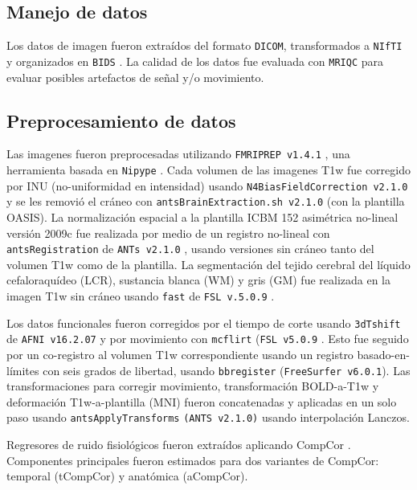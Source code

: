 \subsection{Manejo de datos}
Los datos de imagen fueron extraídos del formato \texttt{DICOM}, transformados a \texttt{NIfTI} y organizados en \texttt{BIDS} \parencite{Gorgolewski2016}.
La calidad de los datos fue evaluada con \texttt{MRIQC} \parencite{Esteban2017} para evaluar posibles artefactos de señal y/o movimiento. \par

\subsection{Preprocesamiento de datos}
Las imagenes fueron preprocesadas utilizando \texttt{FMRIPREP v1.4.1} \parencite{Esteban2019}, una herramienta basada en \texttt{Nipype} \parencite{Gorgolewski2011}.
Cada volumen de las imagenes T1w fue corregido por INU (no-uniformidad en intensidad) usando \texttt{N4BiasFieldCorrection v2.1.0} \parencite{Tustison2010} y se les removió el cráneo con \texttt{antsBrainExtraction.sh v2.1.0} (con la plantilla OASIS).
La normalización espacial a la plantilla ICBM 152 asimétrica no-lineal versión 2009c \parencite{Fonov2009} fue realizada por medio de un registro no-lineal con \texttt{antsRegistration} de \texttt{ANTs v2.1.0} \parencite{Avants2008}, usando versiones sin cráneo tanto del volumen T1w como de la plantilla.
La segmentación del tejido cerebral del líquido cefaloraquídeo (LCR), sustancia blanca (WM) y gris (GM) fue realizada en la imagen T1w sin cráneo usando \texttt{fast} de \texttt{FSL v.5.0.9} \parencite{Zhang2001}.\par
Los datos funcionales fueron corregidos por el tiempo de corte usando \texttt{3dTshift} de \texttt{AFNI v16.2.07} \parencite{Cox1996} y por movimiento con \texttt{mcflirt} (\texttt{FSL v5.0.9} \parencite{Jenkinson2002}.
Esto fue seguido por un co-registro al volumen T1w correspondiente usando un registro basado-en-límites \parencite{Greve2009} con seis grados de libertad, usando \texttt{bbregister} (\texttt{FreeSurfer v6.0.1}).
Las transformaciones para corregir movimiento, transformación BOLD-a-T1w y deformación T1w-a-plantilla (MNI) fueron concatenadas y aplicadas en un solo paso usando \texttt{antsApplyTransforms} \texttt{(ANTS v2.1.0)} usando interpolación Lanczos.\par
Regresores de ruido fisiológicos fueron extraídos aplicando CompCor \parencite{Behzadi2007}.
Componentes principales fueron estimados para dos variantes de CompCor: temporal (tCompCor) y anatómica (aCompCor).
